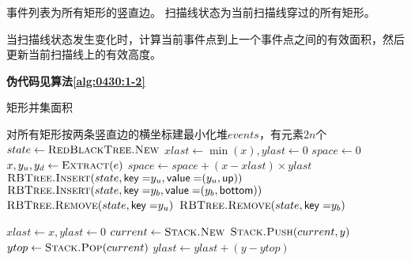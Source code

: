 \documentclass[answers]{exam}
\begin{document}
\begin{questions}
\begin{parts}
\begin{solution}
            事件列表为所有矩形的竖直边。
            扫描线状态为当前扫描线穿过的所有矩形。

            当扫描线状态发生变化时，计算当前事件点到上一个事件点之间的有效面积，然后更新当前扫描线上的有效高度。

            \textbf{伪代码见算法\ref{alg:0430:1-2}}
        \end{solution}

        \begin{algorithm}[!ht]
            \caption{矩形并集面积}\label{alg:0430:1-2}
            \begin{algorithmic}[1]
                 
                \State 对所有矩形按两条竖直边的横坐标建最小化堆$events$，有元素$2n$个 
                \State $state \gets \Call{RedBlackTree.New}{}$
                \State $xlast \gets \min(x), ylast \gets 0$
                \State $space \gets 0$
                \State $x, y_u, y_d \gets \Call{Extract}{e}$
                \State $space \gets space + (x-xlast) \times ylast$
                 
                \State $\Call{RBTree.Insert}{state, \mathsf{key=}y_u, \mathsf{value=}(y_u, \mathsf{up})}$
                \State $\Call{RBTree.Insert}{state, \mathsf{key=}y_b, \mathsf{value=}(y_b, \mathsf{bottom})}$
                 
                \State $\Call{RBTree.Remove}{state, \mathsf{key=}y_u}$
                \State $\Call{RBTree.Remove}{state, \mathsf{key=}y_b}$
                \EndIf

                \State $xlast \gets x, ylast \gets 0$ 
                \State $current \gets \Call{Stack.New}{}$
                \State $\Call{Stack.Push}{current, y}$
                \State $ytop \gets \Call{Stack.Pop}{current}$
                \State $ylast \gets ylast + (y - ytop)$
                \EndIf
                \EndIf
                \EndFor
                \EndFor
            \end{algorithmic}
        \end{algorithm}
    \end{parts}


\end{questions}
\end{document}
